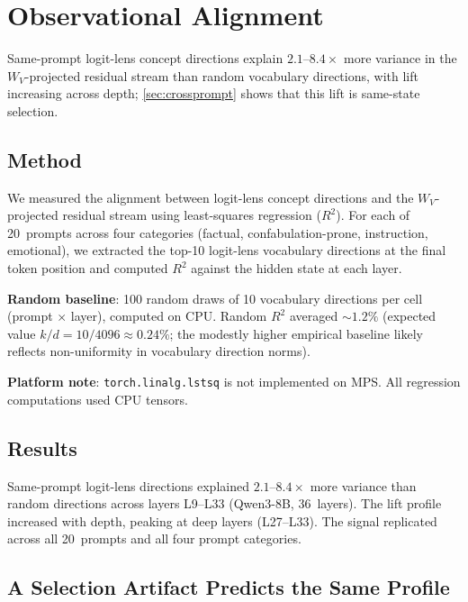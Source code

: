 \documentclass[11pt,a4paper]{article}
\begin{document}
\section{Observational Alignment}
\label{sec:observational}

Same-prompt logit-lens concept directions explain $2.1$--$8.4\times$
more variance in the $W_V$-projected residual stream than random
vocabulary directions, with lift increasing across depth;
\cref{sec:crossprompt} shows that this lift is same-state selection.

\subsection{Method}

We measured the alignment between logit-lens concept directions and
the $W_V$-projected residual stream using least-squares regression
($R^2$). For each of 20~prompts across four categories (factual,
confabulation-prone, instruction, emotional), we extracted the
top-10 logit-lens vocabulary directions at the final token position and
computed $R^2$ against the hidden state at each layer.

\textbf{Random baseline}: 100 random draws of 10 vocabulary directions
per cell (prompt $\times$ layer), computed on CPU. Random $R^2$
averaged ${\sim}1.2\%$ (expected value $k/d = 10/4096 \approx 0.24\%$;
the modestly higher empirical baseline likely reflects non-uniformity
in vocabulary direction norms).

\textbf{Platform note}: \texttt{torch.linalg.lstsq} is not implemented
on MPS. All regression computations used CPU tensors.

\subsection{Results}

Same-prompt logit-lens directions explained $2.1$--$8.4\times$ more
variance than random directions across layers L9--L33 (Qwen3-8B,
36~layers). The lift profile increased with depth, peaking at deep
layers (L27--L33). The signal replicated across all 20~prompts and all
four prompt categories.

\subsection{A Selection Artifact Predicts the Same Profile}
\end{document}
